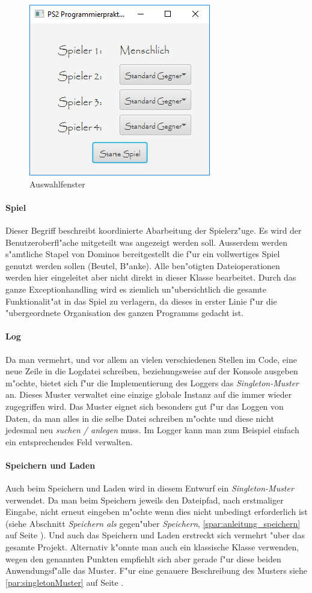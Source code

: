 \begin{figure}
	\centering
	\includegraphics[width=.4\linewidth]{pics/Intro240918}
	\caption[Auswahlfenster]{Auswahlfenster}
	\label{fig:auswahlfenster}
\end{figure}

\paragraph{Spiel}
Dieser Begriff beschreibt koordinierte Abarbeitung der Spielerz"uge. Es wird der Benutzeroberfl"ache mitgeteilt was angezeigt werden soll. Ausserdem werden s"amtliche Stapel von Dominos bereitgestellt die f"ur ein vollwertiges Spiel genutzt werden sollen (Beutel, B"anke). Alle ben"otigten Dateioperationen werden hier eingeleitet aber nicht direkt in dieser Klasse bearbeitet. Durch das ganze Exceptionhandling wird es ziemlich un"ubersichtlich die gesamte Funktionalit"at in das Spiel zu verlagern, da dieses in erster Linie f"ur die "ubergeordnete Organisation des ganzen Programms gedacht ist. 

\paragraph{Log}
Da man vermehrt, und vor allem an vielen verschiedenen Stellen im Code, eine neue Zeile in die Logdatei schreiben, beziehungsweise auf der Konsole ausgeben m"ochte, bietet sich f"ur die Implementierung des Loggers das \emph{Singleton-Muster} an. Dieses Muster verwaltet eine einzige globale Instanz auf die immer wieder zugegriffen wird. Das Muster eignet sich besonders gut f"ur das Loggen von Daten, da man alles in die selbe Datei schreiben m"ochte und diese nicht jedesmal neu \emph{suchen / anlegen} muss. Im Logger kann man zum Beispiel einfach ein entsprechendes Feld verwalten. 

\paragraph{Speichern und Laden}
Auch beim Speichern und Laden wird in diesem Entwurf ein \emph{Singleton-Muster} verwendet. Da man beim Speichern jeweils den Dateipfad, nach erstmaliger Eingabe, nicht erneut eingeben m"ochte wenn dies nicht unbedingt erforderlich ist (siehe Abschnitt 
\emph{Speichern als} gegen"uber \emph{Speichern}, \ref{spar:anleitung_speichern} auf Seite \pageref{spar:anleitung_speichern}). Und auch das Speichern und Laden erstreckt sich vermehrt "uber das gesamte Projekt. Alternativ k"onnte man auch ein klassische Klasse verwenden, wegen den genannten Punkten empfiehlt sich aber gerade f"ur diese beiden Anwendungsf"alle das Muster. F"ur eine genauere Beschreibung des Musters siehe \ref{par:singletonMuster}  auf Seite \pageref{par:singletonMuster}. 
